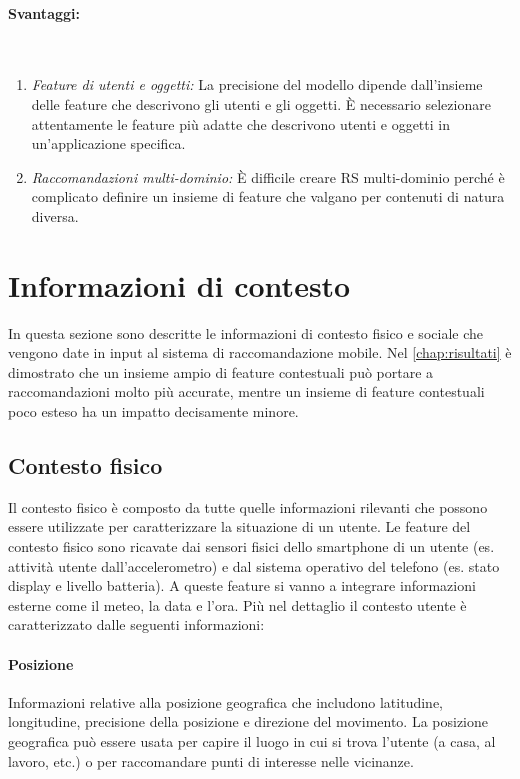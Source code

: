\documentclass[12pt,italian]{report}
\newcommand{\myparagraph}[1]{\paragraph{#1}\mbox{}\\} %
\begin{document}
\hfill

\myparagraph{Svantaggi:}
\begin{enumerate}
 \item \textit{Feature di utenti e oggetti:} La precisione del modello dipende dall'insieme delle feature che descrivono gli utenti e gli oggetti. \`E necessario selezionare attentamente le feature più adatte che descrivono utenti e oggetti in un'applicazione specifica.
  
 \item \textit{Raccomandazioni multi-dominio:} \`E difficile creare RS multi-dominio perché è complicato definire un insieme di feature che valgano per contenuti di natura diversa.
\end{enumerate}

\section{Informazioni di contesto} \label{sec:context-info}
In questa sezione sono descritte le informazioni di contesto fisico e sociale che vengono date in input al sistema di raccomandazione mobile. Nel \autoref{chap:risultati} è dimostrato che un insieme ampio di feature contestuali può portare a raccomandazioni molto più accurate, mentre un insieme di feature contestuali poco esteso ha un impatto decisamente minore.

\subsection{Contesto fisico}
Il contesto fisico è composto da tutte quelle informazioni rilevanti che possono essere utilizzate per caratterizzare la situazione di un utente. Le feature del contesto fisico sono ricavate dai sensori fisici dello smartphone di un utente (es. attività utente dall'accelerometro) e dal sistema operativo del telefono (es. stato display e livello batteria). A queste feature si vanno a integrare informazioni esterne come il meteo, la data e l'ora. Più nel dettaglio il contesto utente è caratterizzato dalle seguenti informazioni:

\paragraph{Posizione} Informazioni relative alla posizione geografica che includono latitudine, longitudine, precisione della posizione e direzione del movimento. La posizione geografica può essere usata per capire il luogo in cui si trova l'utente (a casa, al lavoro, etc.) o per raccomandare punti di interesse nelle vicinanze.
\end{document}
